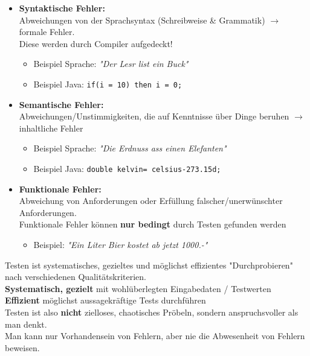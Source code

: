 \documentclass[a4paper]{article}
\begin{document}
			\begin{itemize}
				\item \textbf{Syntaktische Fehler:}\\
						Abweichungen von der Sprachsyntax (Schreibweise \& Grammatik) $\rightarrow$ formale Fehler.\\
						Diese werden durch Compiler aufgedeckt!
						\begin{itemize}
							\item Beispiel Sprache: \textit{"Der Lesr list ein Buck"}
							\item Beispiel Java: \texttt{if(i = 10) then{ i = 0; }}
						\end{itemize}
					
				\item \textbf{Semantische Fehler:}\\
						Abweichungen/Unstimmigkeiten, die auf Kenntnisse über Dinge beruhen $\rightarrow$ inhaltliche Fehler
						\begin{itemize}
							\item Beispiel Sprache: \textit{"Die Erdnuss ass einen Elefanten"}
							\item Beispiel Java: \texttt{double kelvin= celsius-273.15d;}
						\end{itemize}
					
				\item \textbf{Funktionale Fehler:}\\
						Abweichung von Anforderungen oder Erfüllung falscher/unerwünschter Anforderungen.\\
						Funktionale Fehler können \textbf{nur bedingt} durch Testen gefunden werden
						\begin{itemize}
							\item Beispiel: \textit{"Ein Liter Bier kostet ab jetzt 1000.-"}
						\end{itemize}
			\end{itemize}
			\vspace{1em}
			\noindent
			Testen ist systematisches, gezieltes  und möglichst effizientes "Durchprobieren" nach verschiedenen Qualitätskriterien.\\
			\textbf{Systematisch, gezielt} mit wohlüberlegten Eingabedaten / Testwerten\\
			\textbf{Effizient} möglichst aussagekräftige Tests durchführen\\
			Testen ist also \textbf{nicht} zielloses, chaotisches Pröbeln, sondern anspruchsvoller als man denkt.\\
			Man kann nur Vorhandensein von Fehlern, aber nie die Abwesenheit von Fehlern beweisen.
\end{document}
